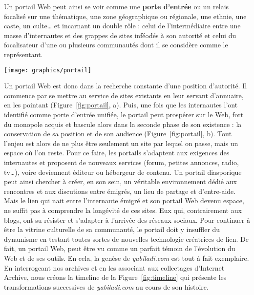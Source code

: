 \documentclass[symmetric,justified,marginals=raggedouter]{tufte-book}
\begin{document}
\noindent Un portail Web peut ainsi se voir comme une \textbf{porte d'entrée} ou un relais focalisé sur une thématique, une zone géographique ou régionale, une ethnie, une caste, un culte\ldots{} et incarnant un double rôle : celui de l'intermédiaire entre une masse d'internautes et des grappes de sites inféodés à son autorité et celui du focalisateur d'une ou plusieurs communautés dont il se considère comme le représentant. 

\newpage 

\begin{figure*}
  \texttt{[image: graphics/portail]}
  \caption{Dynamique de création d'un portail Web autour d'une communauté de sites}
  \label{fig:portail}
\end{figure*}

\noindent Un portail Web est donc dans la recherche constante d'une position d'autorité. Il commence par se mettre au service de sites existants en leur servant d'annuaire, en les pointant (Figure~\ref{fig:portail}, a). Puis, une fois que les internautes l'ont identifié comme porte d'entrée unifiée, le portail peut prospérer sur le Web, fort du monopole acquis et bascule alors dans la seconde phase de son existence : la conservation de sa position et de son audience (Figure~\ref{fig:portail}, b). Tout l'enjeu est alors de ne plus être seulement un site par lequel on passe, mais un espace où l'on reste. Pour ce faire, les portails s'adaptent aux exigences des internautes et proposent de nouveaux services (forum, petites annonces, radio, tv\ldots{}), voire deviennent éditeur ou hébergeur de contenu. Un portail diasporique peut ainsi chercher à créer, en son sein, un véritable environnement dédié aux rencontres et aux discutions entre émigrés, un lieu de partage et d'entre-aide. \\


\noindent Mais le lien qui nait entre l'internaute émigré et son portail Web devenu espace, ne suffit pas à comprendre la longévité de ces sites. Eux qui, contrairement aux blogs, ont su résister et s'adapter à l'arrivée des réseaux sociaux. Pour continuer à être la vitrine culturelle de sa communauté, le portail doit y insuffler du dynamisme en testant toutes sortes de nouvelles technologie créatrices de lien. De fait, un portail Web, peut être vu comme un parfait témoin de l'évolution du Web et de ses outils. En cela, la genèse de \textit{yabiladi.com} est tout à fait exemplaire. En interrogeant nos archives et en les associant aux collectages d'Internet Archive, nous créons la timeline de la Figure~\ref{fig:timeline} qui présente les transformations successives de \textit{yabiladi.com} au cours de son histoire.
\end{document}
